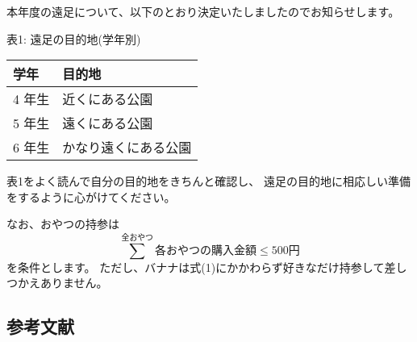 \begin{kekka}
本年度の遠足について、以下のとおり決定いたしましたのでお知らせします。
  \begin{center}
    表1: 遠足の目的地(学年別) \\
    \begin{tabular}{|l|l|}
      \hline
      学年 & 目的地 \\
      \hline \hline
      4 年生 & 近くにある公園 \\
      \hline
      5 年生 & 遠くにある公園 \\
      \hline
      6 年生 & かなり遠くにある公園 \\
      \hline
    \end{tabular}
  \end{center}
表1をよく読んで自分の目的地をきちんと確認し、
遠足の目的地に相応しい準備をするように心がけてください。

なお、おやつの持参は
\begin{equation}
\sum^{全おやつ} 各おやつの購入金額 \le 500 円
\end{equation}
を条件とします。
ただし、バナナは式(1)にかかわらず好きなだけ持参して差しつかえありません。
\end{kekka}


\subsection{参考文献}
\label{sec:latex:bibliography}

